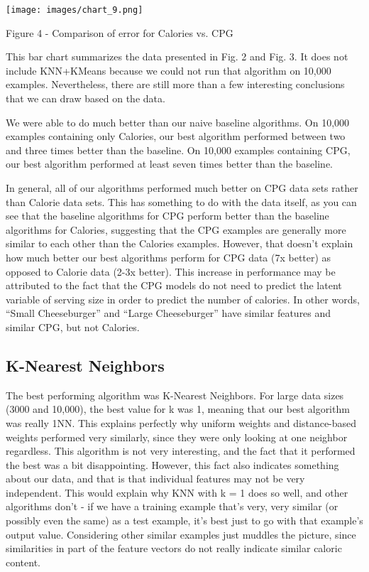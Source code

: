 \documentclass{article}
\begin{document}
\begin{center}
\texttt{[image: images/chart\_9.png]}

Figure 4 - Comparison of error for Calories vs. CPG
\end{center}

This bar chart summarizes the data presented in Fig. 2 and Fig. 3. It does not include KNN+KMeans because we could not run that algorithm on 10,000 examples. Nevertheless, there are still more than a few interesting conclusions that we can draw based on the data.

We were able to do much better than our naive baseline algorithms. On 10,000 examples containing only Calories, our best algorithm performed between two and three times better than the baseline. On 10,000 examples containing CPG, our best algorithm performed at least seven times better than the baseline.

In general, all of our algorithms performed much better on CPG data sets rather than Calorie data sets. This has something to do with the data itself, as you can see that the baseline algorithms for CPG perform better than the baseline algorithms for Calories, suggesting that the CPG examples are generally more similar to each other than the Calories examples. However, that doesn’t explain how much better our best algorithms perform for CPG data (7x better) as opposed to Calorie data (2-3x better). This increase in performance may be attributed to the fact that the CPG models do not need to predict the latent variable of serving size in order to predict the number of calories. In other words, “Small Cheeseburger” and “Large Cheeseburger” have similar features and similar CPG, but not Calories.

\subsection{K-Nearest Neighbors}
The best performing algorithm was K-Nearest Neighbors. For large data sizes (3000 and 10,000), the best value for k was 1, meaning that our best algorithm was really 1NN. This explains perfectly why uniform weights and distance-based weights performed very similarly, since they were only looking at one neighbor regardless. This algorithm is not very interesting, and the fact that it performed the best was a bit disappointing. However, this fact also indicates something about our data, and that is that individual features may not be very independent. This would explain why KNN with k = 1 does so well, and other algorithms don’t - if we have a training example that’s very, very similar (or possibly even the same) as a test example, it’s best just to go with that example’s output value. Considering other similar examples just muddles the picture, since similarities in part of the feature vectors do not really indicate similar caloric content.
\end{document}
